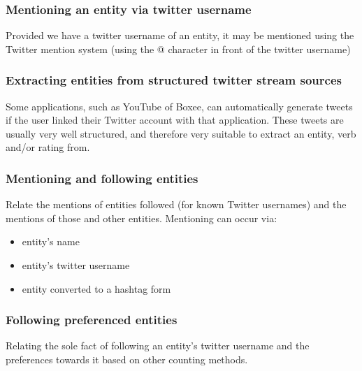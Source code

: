 \documentclass{article}
\begin{document}
\subsubsection{Mentioning an entity via twitter username}
Provided we have a twitter username of an entity, it may be mentioned using 
the Twitter mention system (using the @ character in front of the twitter
 username)
\subsubsection{Extracting entities from structured twitter stream sources}
Some applications, such as YouTube of Boxee, can automatically generate tweets 
if the user linked their Twitter account with that application. These tweets are 
usually very well structured, and therefore very suitable to extract an entity, verb and/or rating from.
\subsubsection{Mentioning and following entities}
Relate the mentions of entities followed (for known Twitter usernames) and the mentions of those and other entities. Mentioning can occur via:
\begin{itemize}
\item entity's name
\item entity's twitter username
\item entity converted to a hashtag form
\end{itemize}
\subsubsection{Following preferenced entities}
Relating the sole fact of following an entity's twitter username and the preferences towards it based on other counting methods.
\end{document}
